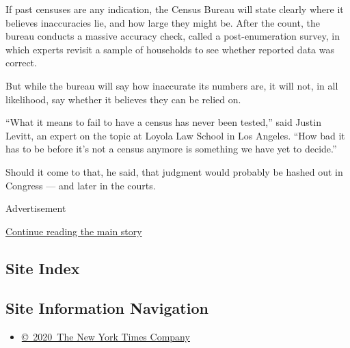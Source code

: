 If past censuses are any indication, the Census Bureau will state
clearly where it believes inaccuracies lie, and how large they might be.
After the count, the bureau conducts a massive accuracy check, called a
post-enumeration survey, in which experts revisit a sample of households
to see whether reported data was correct.

But while the bureau will say how inaccurate its numbers are, it will
not, in all likelihood, say whether it believes they can be relied on.

``What it means to fail to have a census has never been tested,'' said
Justin Levitt, an expert on the topic at Loyola Law School in Los
Angeles. ``How bad it has to be before it's not a census anymore is
something we have yet to decide.''

Should it come to that, he said, that judgment would probably be hashed
out in Congress --- and later in the courts.

Advertisement

\protect\hyperlink{after-bottom}{Continue reading the main story}

\hypertarget{site-index}{%
\subsection{Site Index}\label{site-index}}

\hypertarget{site-information-navigation}{%
\subsection{Site Information
Navigation}\label{site-information-navigation}}

\begin{itemize}
\tightlist
\item
  \href{https://help.nytimes.com/hc/en-us/articles/115014792127-Copyright-notice}{©~2020~The
  New York Times Company}
\end{itemize}

